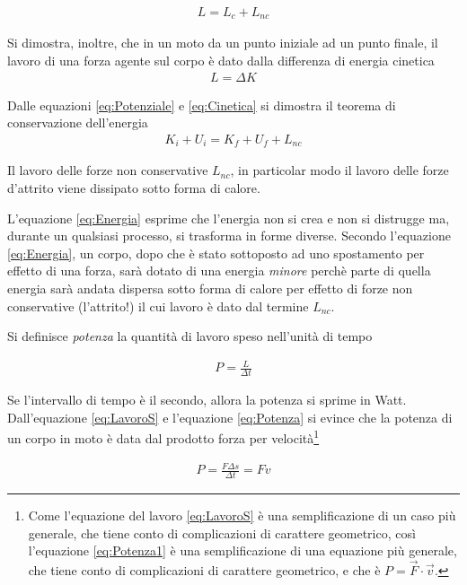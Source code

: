 \documentclass[17pt]{extarticle}
\begin{document}
\begin{eqnarray}
	L = L_{c} + L_{nc}
\end{eqnarray}

Si dimostra, inoltre, che in un moto da un punto iniziale ad un punto finale, il lavoro di una forza agente sul corpo è dato dalla differenza di energia cinetica 
\begin{eqnarray}\label{eq:Cinetica}
	L = \Delta K
\end{eqnarray}

Dalle equazioni \ref{eq:Potenziale} e \ref{eq:Cinetica} si dimostra il teorema di conservazione dell'energia
\begin{eqnarray}\label{eq:Energia}
	K_i + U_i = K_f + U_f + L_{nc}
\end{eqnarray}


Il lavoro delle forze non conservative $L_{nc}$, in particolar modo il lavoro delle forze d'attrito viene dissipato sotto forma di calore. 

L'equazione \ref{eq:Energia} esprime che l'energia non si crea e non si distrugge ma, durante un qualsiasi processo, si trasforma in forme diverse. Secondo l'equazione \ref{eq:Energia}, un corpo, dopo che è stato sottoposto ad uno spostamento per effetto di una forza, sarà dotato di una energia \emph{minore} perchè parte di quella energia sarà andata dispersa sotto forma di calore per effetto di forze non conservative (l'attrito!) il cui lavoro è dato dal termine $L_{nc}$.

Si definisce \emph{potenza} la quantità di lavoro speso nell'unità di tempo

\begin{eqnarray}\label{eq:Potenza}
	P = \frac{L}{\Delta t}
\end{eqnarray}

Se l'intervallo di tempo è il secondo, allora la potenza si sprime in Watt. Dall'equazione \ref{eq:LavoroS} e l'equazione \ref{eq:Potenza} si evince che la potenza di un corpo in moto è data dal prodotto forza per velocità\footnote{Come l'equazione del lavoro \ref{eq:LavoroS} è una semplificazione di un caso più generale, che tiene conto di complicazioni di carattere geometrico, così l'equazione \ref{eq:Potenza1} è una semplificazione di una equazione più generale, che tiene conto di complicazioni di carattere geometrico, e che è $P=\vec{F}\cdot\vec{v}$. }

\begin{eqnarray}\label{eq:Potenza1}
	P = \frac{F\Delta s}{\Delta t} = Fv
\end{eqnarray}
\end{document}
